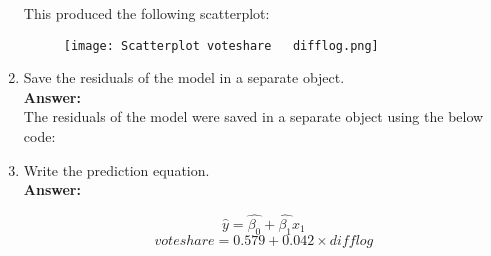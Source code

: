 \documentclass[12pt,letterpaper]{article}
\begin{document}
\begin{enumerate}
		\vspace{.5cm}
		
		This produced the following scatterplot:
		
		\begin{figure}[H]\centering
			\caption{\footnotesize}
			\texttt{[image: Scatterplot voteshare ~ difflog.png]}
		\end{figure} 
		
		\item Save the residuals of the model in a separate object.\\
		
		\textbf{Answer:}\\
		
		The residuals of the model were saved in a separate object using the below code:
		
		\vspace{.5cm}
		
		  
		
		\vspace{.5cm}
		
		\item Write the prediction equation.\\
		
		\textbf{Answer:}
		
		\[\hat{y} = \hat{\beta_0} + \hat{\beta_1}x_1 \]
		\[voteshare = 0.579 + 0.042\times difflog \]
		
	\end{enumerate}
	
\newpage
\end{document}

